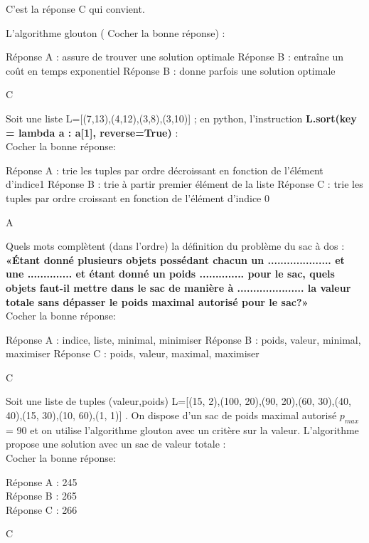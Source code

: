 \documentclass[a4paper,12,%
]{exam}
\begin{document}
\begin{questions}
\begin{solution}
	C'est la réponse C qui  convient.
	
\end{solution}
\medskip


\question L'algorithme glouton ( Cocher la bonne réponse) :

\begin{checkboxes}
\choice Réponse A :  assure de trouver une solution optimale
\choice Réponse B : entraîne un coût en temps exponentiel
\choice Réponse B : donne parfois une solution optimale
\end{checkboxes}
\begin{solution}
	C
\end{solution}
\medskip
\question Soit une liste L=[(7,13),(4,12),(3,8),(3,10)] ; en python, l'instruction \textbf{L.sort(key = lambda a : a[1], reverse=True) }:\\
Cocher la bonne réponse:
\begin{checkboxes}
\choice Réponse A :  trie  les tuples par ordre décroissant en fonction de l'élément d'indice1
\choice Réponse B :  trie à partir premier élément de la liste
\choice Réponse C :  trie  les tuples par ordre croissant en fonction de l'élément d'indice 0
\end{checkboxes}
\begin{solution}
	A
\end{solution}
\medskip
\question Quels mots complètent (dans l'ordre) la définition du problème du sac à dos : \\
\medskip
\textbf{«Étant  donné  plusieurs  objets  possédant chacun  un  ....................  et  une ..............  et  étant  donné  un  poids ..............  pour  le  sac,  quels  objets faut-il  mettre  dans  le  sac  de  manière  à  .....................  la  valeur  totale  sans  dépasser  le  poids maximal autorisé pour le sac?»}\\
\medskip
Cocher la bonne réponse:

\begin{checkboxes}
	\choice Réponse A : indice, liste, minimal, minimiser
\choice Réponse B :  poids, valeur, minimal, maximiser
\choice Réponse C :  poids, valeur, maximal, maximiser
\end{checkboxes}
\begin{solution}
	C
\end{solution}
\medskip
\question Soit une liste de tuples (valeur,poids) L=[(15, 2),(100, 20),(90, 20),(60, 30),(40, 40),(15, 30),(10, 60),(1, 1)] . On dispose d'un sac de poids maximal autorisé $p_{max}$ = 90 et on utilise l'algorithme glouton avec un critère sur la valeur. L'algorithme propose une solution avec un sac de valeur totale :\\
Cocher la bonne réponse:
\begin{checkboxes}
	\choice Réponse A : 245\\
\choice Réponse B : 265\\
\choice Réponse C : 266
\end{checkboxes}
\begin{solution}
	C
\end{solution}

\end{questions}
\end{document}
